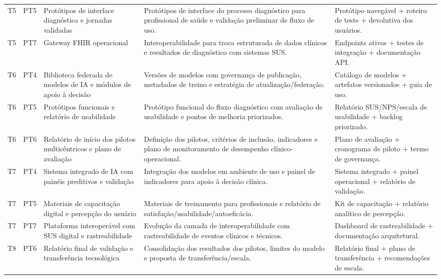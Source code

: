 \documentclass[
    12pt,
    openright,
    oneside,
    a4paper,
    chapter=TITLE,
    section=TITLE,
    brazil,
    sumario=tradicional,
    hidelinks
]{abntex2}
\begin{document}
{\begin{longtable}{L{0.9cm}L{1.1cm}L{3.2cm}L{4.2cm}L{3.1cm}}
T5 & PT5 & Protótipos de interface diagnóstica e jornadas validadas & Protótipos de interface do processo diagnóstico para profissional de saúde e validação preliminar de fluxo de uso. & Protótipo navegável + roteiro de teste + devolutiva dos usuários. \\

T5 & PT7 & Gateway FHIR operacional & Interoperabilidade para troca estruturada de dados clínicos e resultados de diagnóstico com sistemas SUS. & Endpoints ativos + testes de integração + documentação API. \\

T6 & PT4 & Biblioteca federada de modelos de IA e módulos de apoio à decisão & Versões de modelos com governança de publicação, metadados de treino e estratégia de atualização/federação. & Catálogo de modelos + artefatos versionados + guia de uso. \\

T6 & PT5 & Protótipos funcionais e relatório de usabilidade & Protótipo funcional do fluxo diagnóstico com avaliação de usabilidade e pontos de melhoria priorizados. & Relatório SUS/NPS/escala de usabilidade + backlog priorizado. \\

T6 & PT6 & Relatório de início dos pilotos multicêntricos e plano de avaliação & Definição dos pilotos, critérios de inclusão, indicadores e plano de monitoramento de desempenho clínico-operacional. & Plano de avaliação + cronograma de piloto + termo de governança. \\

T7 & PT4 & Sistema integrado de IA com painéis preditivos e validação & Integração dos modelos em ambiente de uso e painel de indicadores para apoio à decisão clínica. & Sistema integrado + painel operacional + relatório de validação. \\

T7 & PT5 & Materiais de capacitação digital e percepção do usuário & Materiais de treinamento para profissionais e relatório de satisfação/usabilidade/autoeficácia. & Kit de capacitação + relatório analítico de percepção. \\

T7 & PT7 & Plataforma interoperável com SUS digital e rastreabilidade & Evolução da camada de interoperabilidade com rastreabilidade de eventos clínicos e técnicos. & Dashboard de rastreabilidade + documentação arquitetural. \\

T8 & PT6 & Relatório final de validação e transferência tecnológica & Consolidação dos resultados dos pilotos, limites do modelo e proposta de transferência/escala. & Relatório final + plano de transferência + recomendações de escala. \\
\bottomrule
\end{longtable}
}
\end{document}

